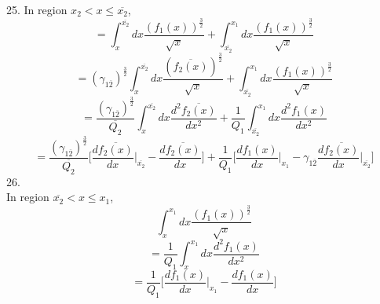 \documentclass[fleqn, 10pt]{article}
\begin{document}
      25. 
           In region $x_{2}<x\leq \overline{x_{2}}$,
           \begin{equation*}
               = \int^{\overline{x_{2}}}_{x} dx \frac{(f_1(x))^\frac{3}{2}}{\sqrt{x}} + \int^{x_1}_{\overline{x_{2}}} dx \frac{(f_1(x))^\frac{3}{2}}{\sqrt{x}}
           \end{equation*}
           \begin{equation*}
               = (\gamma_{1\overline{2}})^\frac{3}{2} \int^{\overline{x_{2}}}_{x} dx \frac{(\overline{f_{2}(x)})^\frac{3}{2}}{\sqrt{x}} + \int^{x_1}_{\overline{x_{2}}} dx \frac{(f_1(x))^\frac{3}{2}}{\sqrt{x}}
           \end{equation*}
           \begin{equation*}
               = \frac{(\gamma_{1\overline{2}})^\frac{3}{2}}{\overline{Q_{2}}} \int^{\overline{x_{2}}}_{x} dx \frac{d^2\overline{f_{2}(x)}}{dx^2} + \frac{1}{Q_1} \int^{x_1}_{\overline{x_{2}}} dx \frac{d^2f_1(x)}{dx^2}
           \end{equation*}
           \begin{equation}
               =   \frac{(\gamma_{1\overline{2}})^\frac{3}{2}}{\overline{Q_{2}}} \biggl[ \frac{d\overline{f_{2}(x)}}{dx} \Bigg|_{\overline{x_{2}}} - \frac{d\overline{f_{2}(x)}}{dx} \biggr] +   \frac{1}{Q_1} \biggl[ \frac{df_1(x)}{dx} \Bigg|_{x_1} -  \gamma_{1\overline{2}} \frac{d\overline{f_{2}(x)}}{dx} \Bigg|_{\overline{x_{2}}} \biggr]
               \label{110}
           \end{equation}
           26. \\ 
           In region $\overline{x_{2}}<x\leq x_1$,
           \begin{equation*}
               \int^{x_1}_{x} dx \frac{(f_1(x))^\frac{3}{2}}{\sqrt{x}}
           \end{equation*}
           \begin{equation*}
               = \frac{1}{Q_1} \int^{x_1}_{x} dx \frac{d^2f_1(x)}{dx^2}
           \end{equation*}
           \begin{equation}
               =  \frac{1}{Q_1} \biggl[ \frac{df_1(x)}{dx} \Bigg|_{x_1} - \frac{df_1(x)}{dx} \biggr]
               \label{111}
           \end{equation}            
\end{document}
